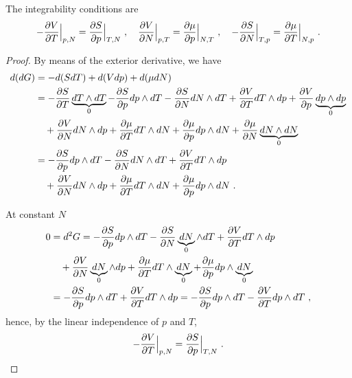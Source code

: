     The integrability conditions are 
    \begin{equation}\label{td:int:g}
        - \frac{\partial V}{\partial T} \Big \vert_{p,N} = \frac{\partial S}{\partial p} \Big \vert_{T,N} ~, \quad 
        \frac{\partial V}{\partial N} \Big \vert_{p,T} = \frac{\partial\mu}{\partial p} \Big \vert_{N, T} ~, \quad 
        - \frac{\partial S}{\partial N} \Big \vert_{T,p} = \frac{\partial\mu}{\partial T} \Big \vert_{N, p} ~. 
    \end{equation}
    \begin{proof}
        By means of the exterior derivative, we have 
        \begin{equation*}
        \begin{aligned}
            d (dG) & = - d (S dT) + d (V dp) + d (\mu dN) \\ & = - \frac{\partial S}{\partial T} \underbrace{dT \wedge dT}_0 - \frac{\partial S}{\partial p} dp \wedge dT - \frac{\partial S}{\partial N} dN \wedge dT + \frac{\partial V}{\partial T} dT \wedge dp + \frac{\partial V}{\partial p} \underbrace{dp \wedge dp}_0 \\ & \quad + \frac{\partial V}{\partial N} dN \wedge dp + \frac{\partial\mu}{\partial T} dT \wedge dN + \frac{\partial\mu}{\partial p} dp \wedge dN + \frac{\partial\mu}{\partial N} \underbrace{dN \wedge dN}_0 \\ & = - \frac{\partial S}{\partial p} dp \wedge dT - \frac{\partial S}{\partial N} dN \wedge dT + \frac{\partial V}{\partial T} dT \wedge dp \\ & \quad + \frac{\partial V}{\partial N} dN \wedge dp + \frac{\partial\mu}{\partial T} dT \wedge dN + \frac{\partial\mu}{\partial p} dp \wedge dN ~.
        \end{aligned}
        \end{equation*}

        At constant $N$ 
        \begin{equation*}
        \begin{aligned}
            0 & = d^2 G = - \frac{\partial S}{\partial p} dp \wedge dT - \frac{\partial S}{\partial N} \underbrace{dN}_0 \wedge dT + \frac{\partial V}{\partial T} dT \wedge dp \\ & \quad + \frac{\partial V}{\partial N} \underbrace{dN}_0 \wedge dp + \frac{\partial\mu}{\partial T} dT \wedge \underbrace{dN}_0 + \frac{\partial\mu}{\partial p} dp \wedge \underbrace{dN}_0 \\ & = - \frac{\partial S}{\partial p} dp \wedge dT + \frac{\partial V}{\partial T} dT \wedge dp = - \frac{\partial S}{\partial p} dp \wedge dT - \frac{\partial V}{\partial T} dp \wedge dT ~,
        \end{aligned}
        \end{equation*}
        hence, by the linear independence of $p$ and $T$,
        \begin{equation*}
            - \frac{\partial V}{\partial T} \Big \vert_{p,N} = \frac{\partial S}{\partial p} \Big \vert_{T,N} ~.
        \end{equation*}


\end{proof}
